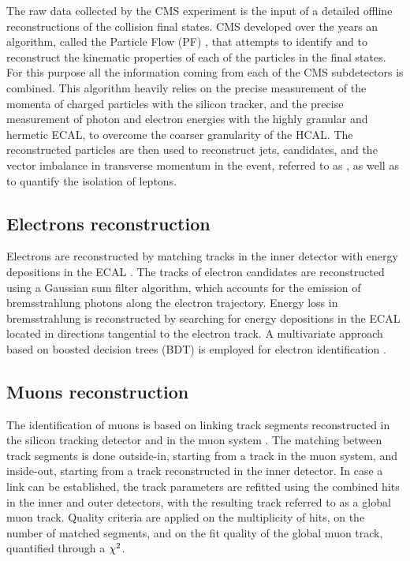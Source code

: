 The raw data collected by the CMS experiment is the input of a detailed offline reconstructions of the collision final states. CMS developed over the years an algorithm, called the Particle Flow (PF) \cite{CMS:2009nxa,CMS:2010byl}, that attempts to identify and to reconstruct the kinematic properties of each of the particles in the final states. For this purpose all the information coming from each of the CMS subdetectors is combined. This algorithm heavily relies on the precise measurement of the momenta of charged particles with the silicon tracker, and the precise measurement of photon and electron energies with the highly granular and hermetic ECAL, to overcome the coarser granularity of the HCAL. The reconstructed particles are then used to reconstruct jets, \hadtau candidates, and the vector imbalance in transverse momentum in the event, referred to as \ptvecmiss, as well as to quantify the isolation of leptons. 

\subsection{Electrons reconstruction}

Electrons are reconstructed by matching tracks in the inner detector with energy depositions in the ECAL \cite{CMS:2009nxa,Baffioni2007}. The tracks of electron candidates are reconstructed using a Gaussian sum filter \cite{Adam:2005bya} algorithm, which accounts for the emission of bremsstrahlung photons along the electron trajectory. Energy loss in bremsstrahlung is reconstructed by searching for energy depositions in the ECAL located in directions tangential to the electron track. A multivariate approach based on boosted decision trees (BDT) \cite{Hocker:2007ht} is employed for electron identification \cite{1748-0221-10-06-P06005}.

\subsection{Muons reconstruction}

 The identification of muons is based on linking track segments reconstructed in the silicon tracking detector and in the muon system \cite{Chatrchyan:2012xi}. The matching between track segments is done outside-in, starting from a track in the muon system, and inside-out, starting from a track reconstructed in the inner detector. In case a link can be established, the track parameters are refitted using the combined hits in the inner and outer detectors, with the resulting track referred to as a global muon track. Quality criteria are applied on the multiplicity of hits, on the number of matched segments, and on the fit quality of the global muon track, quantified through a \ensuremath{\chisquare}.

